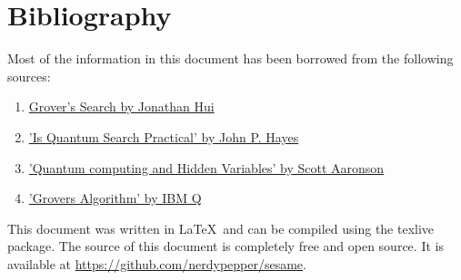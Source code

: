 \documentclass[a4paper]{article}
\begin{document}
\section{ Bibliography }

Most of the information in this document has been borrowed from the following 
sources:

\begin{enumerate}
    \item \href{https://medium.com/@jonathan_hui/qc-grovers-algorithm-cd81e61cf248}{Grover's Search by Jonathan Hui}
    \item \href{https://web.eecs.umich.edu/~imarkov/pubs/jour/cise05-grov.pdf}{'Is Quantum Search Practical' by John P. Hayes}
    \item \href{https://www.scottaaronson.com/papers/qchvpra.pdf}{'Quantum computing and Hidden Variables' by Scott Aaronson}
    \item \href{https://quantumexperience.ng.bluemix.net/proxy/tutorial/full-user-guide/004-Quantum_Algorithms/}{'Grovers Algorithm' by IBM Q}
\end{enumerate}

This document was written in \LaTeX ~and can be compiled using the texlive package. The 
source of this document is completely free and open source.
It is available at \url{https://github.com/nerdypepper/sesame}.
\end{document}
